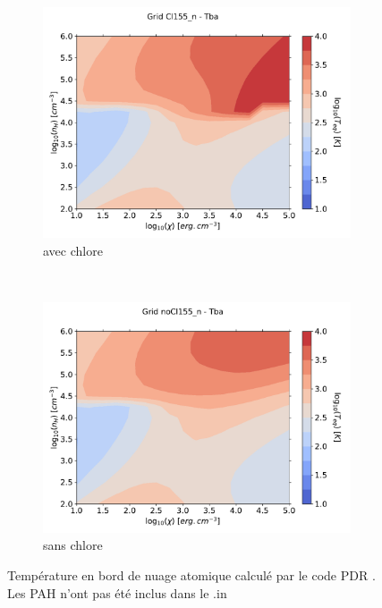 \begin{figure}[!htbp]
    \centering
    \begin{subfigure}[t]{0.45\textwidth} %
        \centering \includegraphics[trim = {0 0 0 1.5cm},clip,width=1\textwidth]{figure/Cl/grid/mapTba.pdf}
        \caption{avec chlore}
    \end{subfigure}
    ~ 
    \begin{subfigure}[t]{0.45\textwidth}
        \centering \includegraphics[trim = {0 0 0 1.5cm},clip,width=1\textwidth]{figure/Cl/grid/nomapTba.pdf}
        \caption{sans chlore}
    \end{subfigure}
    \caption{Température en bord de nuage atomique calculé par le code PDR \uncinq. Les PAH n'ont pas été inclus dans le .in}
    \label{fig:Cl:grid:mapT}
\end{figure}

